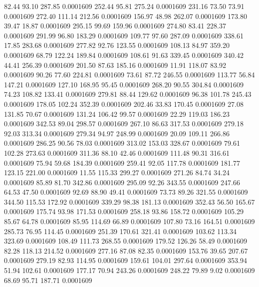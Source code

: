   82.44   93.10  287.85   0.0001609
 252.44   95.81  275.24   0.0001609
 231.16   73.50   73.91   0.0001609
 272.40  111.14  212.56   0.0001609
 156.97   48.98  262.07   0.0001609
 173.80   39.47   18.87   0.0001609
 295.15   99.69  159.96   0.0001609
 274.80   83.41  228.37   0.0001609
 291.99   96.80  183.29   0.0001609
 109.77   97.60  287.09   0.0001609
 338.61   17.85  283.68   0.0001609
 277.82   92.76  123.55   0.0001609
 108.13   84.97  359.20   0.0001609
  68.79  122.24  189.84   0.0001609
 108.61   91.63  339.45   0.0001609
 340.42   44.41  256.39   0.0001609
 201.50   87.63  185.16   0.0001609
  11.91  118.07   83.92   0.0001609
  90.26   77.60  224.81   0.0001609
  73.61   87.72  246.55   0.0001609
 113.77   56.84  147.21   0.0001609
 127.10  168.95   95.45   0.0001609
 268.20   90.55  304.84   0.0001609
  74.23  108.82  133.41   0.0001609
 279.81   88.44  129.62   0.0001609
  96.38  101.78  245.43   0.0001609
 178.05  102.24  352.39   0.0001609
 202.46   33.83  170.45   0.0001609
  27.08  131.85   70.67   0.0001609
 131.24  106.42   99.57   0.0001609
  22.29  119.03  186.23   0.0001609
 342.53   89.04  298.57   0.0001609
 267.10   86.63  317.53   0.0001609
 279.18   92.03  313.34   0.0001609
 279.34   94.97  248.99   0.0001609
  20.09  109.11  266.86   0.0001609
 286.25   90.56   78.03   0.0001609
 313.02  153.03  328.67   0.0001609
  79.61  102.28  273.63   0.0001609
 311.36   88.10   42.46   0.0001609
 111.48   90.31  316.61   0.0001609
  75.94   59.68  184.39   0.0001609
 259.41   92.05  117.78   0.0001609
 181.77  123.15  221.00   0.0001609
  11.55  115.33  299.27   0.0001609
 271.26   84.74   34.24   0.0001609
  85.89   81.70  342.86   0.0001609
 295.09   92.26  343.55   0.0001609
 247.66   64.53   47.50   0.0001609
  92.69   88.90   49.41   0.0001609
  73.73   89.26  321.55   0.0001609
 344.50  115.53  172.92   0.0001609
 339.29   98.38  181.13   0.0001609
 352.43   56.50  165.67   0.0001609
 175.74   93.98  171.53   0.0001609
 258.18   93.86  158.72   0.0001609
 105.29   85.67   64.78   0.0001609
  85.95  114.69   66.89   0.0001609
 107.80   73.16  164.51   0.0001609
 285.73   76.95  114.45   0.0001609
 251.39  170.61  321.41   0.0001609
 103.62  113.34  323.69   0.0001609
 108.49  111.73  268.55   0.0001609
 179.52  126.26   58.49   0.0001609
  82.28  118.13  214.52   0.0001609
 277.16   87.08   82.35   0.0001609
 153.76   39.65  207.67   0.0001609
 279.19   82.93  114.95   0.0001609
 159.61  104.01  297.64   0.0001609
 353.94   51.94  102.61   0.0001609
 177.17   70.94  243.26   0.0001609
 248.22   79.89    9.02   0.0001609
  68.69   95.71  187.71   0.0001609
